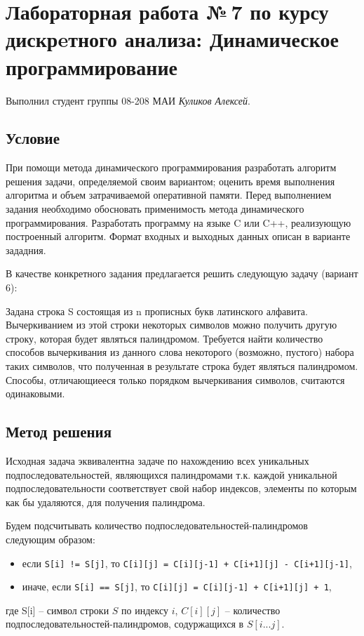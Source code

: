 \documentclass[12pt]{article}
\begin{document}
\section*{Лабораторная работа №\,7 по курсу дискрeтного анализа: Динамическое программирование
}

Выполнил студент группы 08-208 МАИ \textit{Куликов Алексей}.

\subsection*{Условие}
При помощи метода динамического программирования разработать алгоритм решения задачи, определяемой
своим вариантом; оценить время выполнения алгоритма и объем затрачиваемой оперативной памяти. Перед
выполнением задания необходимо обосновать применимость метода динамического программирования.
Разработать программу на языке C или C++, реализующую построенный алгоритм. Формат входных и
выходных данных описан в варианте зададния.

 В качестве конкретного задания предлагается решить следующую задачу (вариант 6): 

Задана строка S состоящая из n прописных букв латинского алфавита. Вычеркиванием из этой строки
некоторых символов можно получить другую строку, которая будет являться палиндромом. Требуется найти
количество способов вычеркивания из данного слова некоторого (возможно, пустого) набора таких символов,
что полученная в результате строка будет являться палиндромом. Способы, отличающиееся только порядком
вычеркивания символов, считаются одинаковыми.

\subsection*{Метод решения}

Исходная задача эквивалентна задаче по нахождению всех уникальных подпоследовательностей, являющихся палиндромами т.к. каждой уникальной подпоследовательности соответствует свой набор индексов, элементы по которым как бы удаляются, для получения палиндрома.

Будем подсчитывать количество подпоследовательностей-палиндромов следующим образом:
\begin{itemize}
    \item если \verb|S[i] != S[j]|, то \verb|C[i][j] = C[i][j-1] + C[i+1][j] - С[i+1][j-1]|,
    \item иначе, если \verb|S[i] == S[j]|, то \verb|C[i][j] = C[i][j-1] + C[i+1][j] + 1|,
\end{itemize}
где S[i] -- символ строки $S$ по индексу $i$, $C[i][j]$ -- количество подпоследовательностей-палиндромов, содуржащихся в $S[i...j]$.
\end{document}
